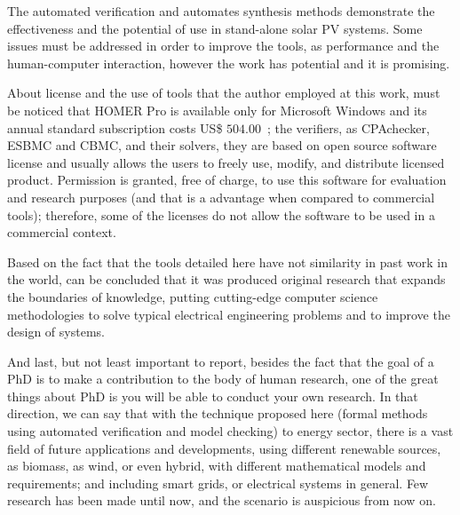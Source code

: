 The automated verification and automates synthesis methods demonstrate the effectiveness and the potential of use in stand-alone solar PV systems. Some issues must be addressed in order to improve the tools, as performance and the human-computer interaction, however the work has potential and it is promising.

About license and the use of tools that the author employed at this work, must be noticed that HOMER Pro is available only for Microsoft Windows and its annual standard subscription costs US\$ $504.00$~\cite{HOMER}; the verifiers, as CPAchecker, ESBMC and CBMC, and their solvers, they are  based on open source software license and usually allows the users to freely use, modify, and distribute licensed product. Permission is granted, free of charge, to use this software for evaluation and research purposes (and that is a advantage when compared to commercial tools); therefore, some of the licenses do not allow the software to be used in a commercial context.

Based on the fact that the tools detailed here have not similarity in past work in the world, can be concluded that it was produced original research that expands the boundaries of knowledge, putting cutting-edge computer science methodologies to solve typical electrical engineering problems and to improve the design of systems.

And last, but not least important to report, besides the fact that the goal of a PhD is to make a contribution to the body of human research, one of the great things about PhD is you will be able to conduct your own research. In that direction, we can say that with the technique proposed here (formal methods using automated verification and model checking) to energy sector, there is a vast field of future applications and developments, using different renewable sources, as biomass, as wind, or even hybrid, with different mathematical models and requirements; and including smart grids, or electrical systems in general. Few research has been made until now, and the scenario is auspicious from now on.


